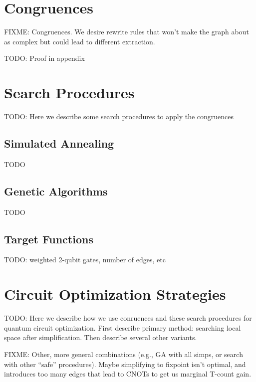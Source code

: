 \section{Congruences}

FIXME: Congruences. We desire rewrite rules that won't make the graph about as complex but could lead to different extraction.

TODO: Proof in appendix

\section{Search Procedures}

TODO: Here we describe some search procedures to apply the congruences

\subsection{Simulated Annealing}

TODO

\subsection{Genetic Algorithms}

TODO

\subsection{Target Functions}

TODO: weighted 2-qubit gates, number of edges, etc


\section{Circuit Optimization Strategies}

TODO: Here we describe how we use conruences and these search procedures for quantum circuit optimization. First describe primary method: searching local space after simplification. Then describe several other variants.

FIXME: Other, more general combinations (e.g., GA with all simps, or search with other ``safe'' procedures). Maybe simplifying to fixpoint isn't optimal, and introduces too many edges that lead to CNOTs to get us marginal T-count gain.


